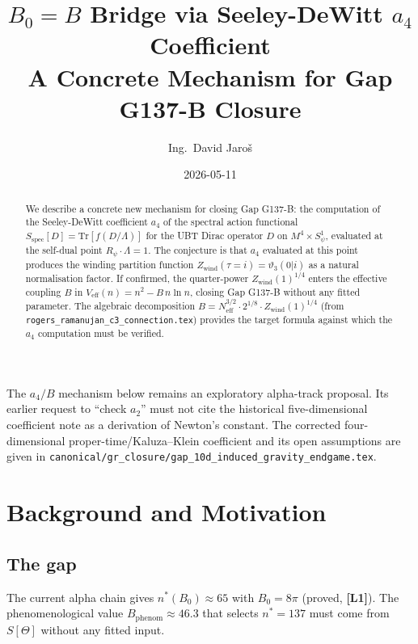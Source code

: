 \documentclass[12pt,a4paper]{article}
\title{\textbf{$B_0 = B$ Bridge via Seeley-DeWitt $a_4$ Coefficient}\\
{\large A Concrete Mechanism for Gap G137-B Closure}}
\author{Ing.\ David Jaro\v{s}}
\date{2026-05-11}
\theoremstyle{remark}
\newcommand{\Lone}{\textbf{[L1]}}
\begin{document}
\maketitle

\begin{tcolorbox}[colback=yellow!7!white,colframe=yellow!55!black,
 title={GR-normalisation correction}]
The $a_4/B$ mechanism below remains an exploratory alpha-track proposal.
Its earlier request to ``check $a_2$'' must not cite the historical
five-dimensional coefficient note as a derivation of Newton's constant.
The corrected four-dimensional proper-time/Kaluza--Klein coefficient and its
open assumptions are given in
\texttt{canonical/gr\_closure/gap\_10d\_induced\_gravity\_endgame.tex}.
\end{tcolorbox}

\begin{abstract}
We describe a concrete new mechanism for closing Gap G137-B: the computation of
the Seeley-DeWitt coefficient $a_4$ of the spectral action functional
$S_{\mathrm{spec}}[D] = \mathrm{Tr}[f(D/\Lambda)]$ for the UBT Dirac operator $D$
on $M^4\times S^1_\psi$, evaluated at the self-dual point $R_\psi\cdot\Lambda=1$.
The conjecture is that $a_4$ evaluated at this point produces the winding
partition function $Z_{\mathrm{wind}}(\tau=i) = \vartheta_3(0|i)$ as a natural
normalisation factor.  If confirmed, the quarter-power
$Z_{\mathrm{wind}}(1)^{1/4}$ enters the effective coupling $B$ in
$V_{\mathrm{eff}}(n) = n^2 - B\,n\ln n$, closing Gap G137-B without any
fitted parameter.
The algebraic decomposition
$B = N_{\mathrm{eff}}^{3/2}\cdot 2^{1/8}\cdot Z_{\mathrm{wind}}(1)^{1/4}$
(from \texttt{rogers\_ramanujan\_c3\_connection.tex}) provides the target
formula against which the $a_4$ computation must be verified.
\end{abstract}

\section{Background and Motivation}
\label{sec:background}

\subsection{The gap}

The current alpha chain gives $n^*(B_0) \approx 65$ with $B_0 = 8\pi$ (proved,
\Lone).  The phenomenological value $B_{\mathrm{phenom}} \approx 46.3$ that
selects $n^* = 137$ must come from $S[\Theta]$ without any fitted input.
\end{document}
